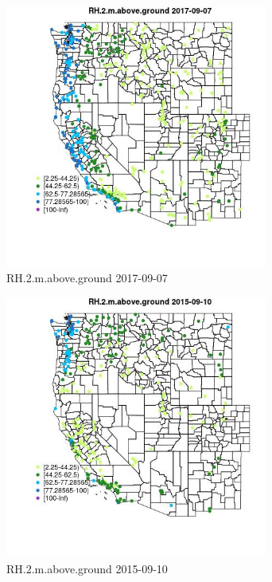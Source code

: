 \begin{figure} 
\centering  
\includegraphics[width=0.77\textwidth]{Code_Outputs/Report_ML_input_PM25_Step4_part_e_de_duplicated_aves_compiled_2019-05-20wNAs_MapObsRH2maboveground2017-09-07.jpg} 
\caption{\label{fig:Report_ML_input_PM25_Step4_part_e_de_duplicated_aves_compiled_2019-05-20wNAsMapObsRH2maboveground2017-09-07}RH.2.m.above.ground 2017-09-07} 
\end{figure} 
 

\begin{figure} 
\centering  
\includegraphics[width=0.77\textwidth]{Code_Outputs/Report_ML_input_PM25_Step4_part_e_de_duplicated_aves_compiled_2019-05-20wNAs_MapObsRH2maboveground2015-09-10.jpg} 
\caption{\label{fig:Report_ML_input_PM25_Step4_part_e_de_duplicated_aves_compiled_2019-05-20wNAsMapObsRH2maboveground2015-09-10}RH.2.m.above.ground 2015-09-10} 
\end{figure} 
 

